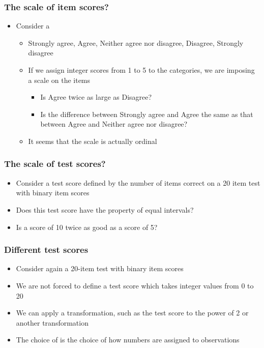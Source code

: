 \documentclass[compress]{beamer}\usepackage[]{graphicx}\usepackage[]{xcolor}
\begin{document}
\begin{frame}[fragile]
  \frametitle{The scale of item scores?}
    \begin{itemize}
      \item Consider a 
      \begin{itemize}
        \item Strongly agree, Agree, Neither agree nor disagree, Disagree, Strongly disagree
        \item If we assign integer scores from 1 to 5 to the categories, we are imposing a scale on the items
          \begin{itemize}
            \item Is Agree twice as large as Disagree?
            \item Is the difference between Strongly agree and Agree the same as that between Agree and Neither agree nor disagree?
          \end{itemize}
        \item It seems that the scale is actually ordinal
      \end{itemize}
    \end{itemize}
\end{frame}


\begin{frame}[fragile]
  \frametitle{The scale of test scores?}
    \begin{itemize}
      \item Consider a test score defined by the number of items correct on a 20 item test with binary item scores
      \item Does this test score have the property of equal intervals?
      \item Is a score of 10 twice as good as a score of 5?
    \end{itemize}
\end{frame}


\begin{frame}[fragile]
  \frametitle{Different test scores}
    \begin{itemize}
      \item Consider again a 20-item test with binary item scores
      \item We are not forced to define a test score which takes integer values from 0 to 20
      \item We can apply a transformation, such as the test score to the power of 2 or another transformation
      \item The choice of  is the choice of how numbers are assigned to observations
    \end{itemize}
\end{frame}
\end{document}

